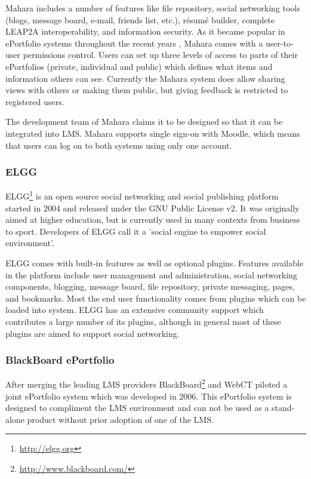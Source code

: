 Mahara includes a number of features like file repository, social networking
tools (blogs, message board, e-mail, friends list, etc.), résumé builder,
complete LEAP2A interoperability, and information security. As it became popular
in ePortfolio systems throughout the recent years \citep{Waters2009},
Mahara comes with a user-to-user permissions control. Users can set up three
levels of access to parts of their ePortfolios (private, individual and public)
which defines what items and information others can see. Currently the Mahara
system does allow sharing views with others or making them public, but giving
feedback is restricted to registered users. 

The development team of Mahara claims it to be designed so that it can be
integrated into LMS. Mahara supports single sign-on with Moodle, which means
that users can log on to both systems using only one account.

\subsubsection{ELGG}
ELGG\footnote{\url{http://elgg.org}} is an open source social networking and
social publishing platform started in 2004 and released under the GNU Public
License v2. It was originally aimed at higher education, but is currently used
in many contexts from business to sport. Developers of ELGG call it a 'social
engine to empower social environment'.

ELGG comes with built-in features as well as optional plugins. Features
available in the platform include user management and administration, social
networking components, blogging, message board, file repository, private
messaging, pages, and bookmarks. Most the end user functionality comes from
plugins which can be loaded into system. ELGG has an extensive community support
which contributes a large number of its plugins, although in general most of
these plugins are aimed to support social networking.

\subsubsection{BlackBoard ePortfolio}
After merging the leading LMS providers
BlackBoard\footnote{\url{http://www.blackboard.com/}} and WebCT piloted a joint
ePortfolio system which was developed in 2006. This ePortfolio system is
designed to compliment the LMS environment and can not be used as a stand-alone
product without prior adoption of one of the LMS.

